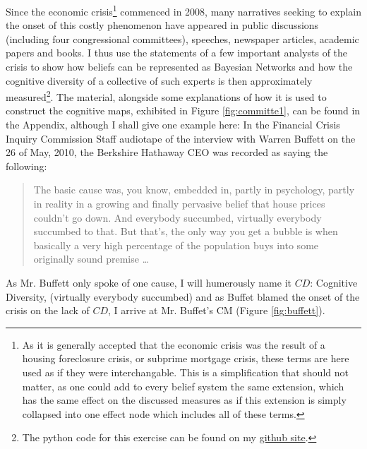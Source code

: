 \documentclass[11pt]{article}
\begin{document}
Since the economic crisis\footnote{As it is generally accepted that the economic crisis was the result of a housing foreclosure crisis, or subprime mortgage crisis, these terms are here used as if they were interchangable. This is a simplification that should not matter, as one could add to every belief system the same extension, which has the same effect on the discussed measures as if this extension is simply collapsed into one effect node which includes all of these terms.
 } commenced in 2008, many narratives seeking to explain the onset of this costly phenomenon have appeared in public discussions (including four congressional committees), speeches, newspaper articles, academic papers and books. I thus use the statements of a few important analysts of the crisis to show how beliefs can be represented as Bayesian Networks and how the cognitive diversity of a collective of such experts is then approximately measured\footnote{The python code for this exercise can be found on my \href{https://github.com/jac2130/DiversityMeasures/blob/master/BayesNets.py}{github site}.
 }. The material, alongside some explanations of how it is used to construct the cognitive maps, exhibited in Figure \ref{fig:committe1}, can be found in the Appendix, although I shall give one example here:
In the Financial Crisis Inquiry Commission Staff audiotape of the interview with Warren Buffett on the 26 of May, 2010, the Berkshire Hathaway CEO was recorded as saying the following:

\begin{quotation}
The basic cause was, you know, embedded in, partly in psychology, partly in reality in a growing and finally pervasive belief that house prices couldn't go down. And everybody succumbed, virtually everybody succumbed to that. But that's, the only way you get a bubble is when basically a very high percentage of the population buys into some originally sound premise \ldots
\end{quotation}

As Mr. Buffett only spoke of one cause, I will humerously name it $CD$: Cognitive Diversity, (virtually everybody succumbed) and as Buffet blamed the onset of the crisis on the lack of $CD$, I arrive at Mr. Buffet's CM (Figure \ref{fig:buffett}).
\end{document}
